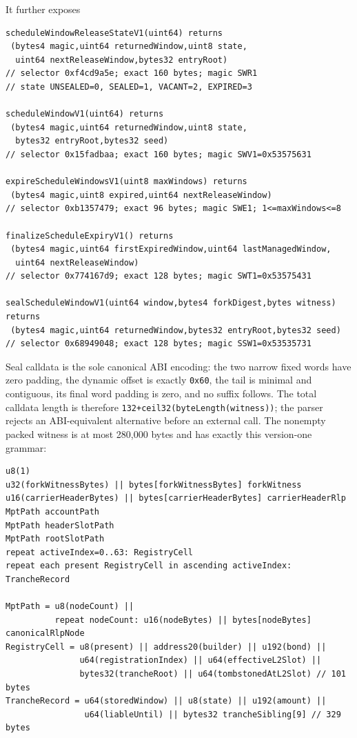 \documentclass[a4paper,11pt]{article}
\newcommand{\code}[1]{\nolinkurl{#1}}
\begin{document}
It further exposes
\begin{verbatim}
scheduleWindowReleaseStateV1(uint64) returns
 (bytes4 magic,uint64 returnedWindow,uint8 state,
  uint64 nextReleaseWindow,bytes32 entryRoot)
// selector 0xf4cd9a5e; exact 160 bytes; magic SWR1
// state UNSEALED=0, SEALED=1, VACANT=2, EXPIRED=3

scheduleWindowV1(uint64) returns
 (bytes4 magic,uint64 returnedWindow,uint8 state,
  bytes32 entryRoot,bytes32 seed)
// selector 0x15fadbaa; exact 160 bytes; magic SWV1=0x53575631

expireScheduleWindowsV1(uint8 maxWindows) returns
 (bytes4 magic,uint8 expired,uint64 nextReleaseWindow)
// selector 0xb1357479; exact 96 bytes; magic SWE1; 1<=maxWindows<=8

finalizeScheduleExpiryV1() returns
 (bytes4 magic,uint64 firstExpiredWindow,uint64 lastManagedWindow,
  uint64 nextReleaseWindow)
// selector 0x774167d9; exact 128 bytes; magic SWT1=0x53575431

sealScheduleWindowV1(uint64 window,bytes4 forkDigest,bytes witness) returns
 (bytes4 magic,uint64 returnedWindow,bytes32 entryRoot,bytes32 seed)
// selector 0x68949048; exact 128 bytes; magic SSW1=0x53535731
\end{verbatim}
Seal calldata is the sole canonical ABI encoding: the two narrow fixed words
have zero padding, the dynamic offset is exactly \code{0x60}, the tail is
minimal and contiguous, its final word padding is zero, and no suffix follows.
The total calldata length is therefore
\code{132+ceil32(byteLength(witness))}; the parser rejects an ABI-equivalent
alternative before an external call.  The nonempty packed witness is at most
280,000 bytes and has exactly this version-one grammar:
\begin{verbatim}
u8(1)
u32(forkWitnessBytes) || bytes[forkWitnessBytes] forkWitness
u16(carrierHeaderBytes) || bytes[carrierHeaderBytes] carrierHeaderRlp
MptPath accountPath
MptPath headerSlotPath
MptPath rootSlotPath
repeat activeIndex=0..63: RegistryCell
repeat each present RegistryCell in ascending activeIndex: TrancheRecord

MptPath = u8(nodeCount) ||
          repeat nodeCount: u16(nodeBytes) || bytes[nodeBytes] canonicalRlpNode
RegistryCell = u8(present) || address20(builder) || u192(bond) ||
               u64(registrationIndex) || u64(effectiveL2Slot) ||
               bytes32(trancheRoot) || u64(tombstonedAtL2Slot) // 101 bytes
TrancheRecord = u64(storedWindow) || u8(state) || u192(amount) ||
                u64(liableUntil) || bytes32 trancheSibling[9] // 329 bytes
\end{verbatim}
\end{document}
